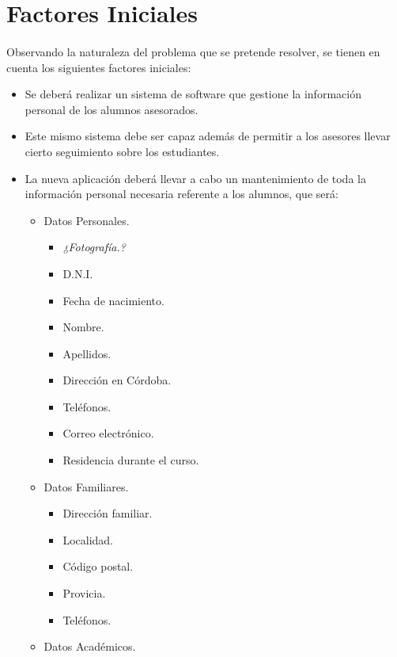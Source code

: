 \section{Factores Iniciales}

\paragraph{}Observando la naturaleza del problema que se pretende resolver, se
tienen en cuenta los siguientes factores iniciales:

\begin{itemize}
   \item Se deberá realizar un sistema de software que gestione la información
   personal de los alumnos asesorados.
   \item Este mismo sistema debe ser capaz además de permitir a los asesores
   llevar cierto seguimiento sobre los estudiantes.
   \item La nueva aplicación deberá llevar a cabo un mantenimiento de toda la
   información personal necesaria referente a los alumnos, que será:
   \begin{itemize}
      \item Datos Personales.
      \begin{itemize}
         \item \textit{¿Fotografía.?}
         \item D.N.I.
         \item Fecha de nacimiento.
         \item Nombre.
         \item Apellidos.
         \item Dirección en Córdoba.
         \item Teléfonos.
         \item Correo electrónico.
         \item Residencia durante el curso.
      \end{itemize}
      \item Datos Familiares.
      \begin{itemize}
         \item Dirección familiar.
         \item Localidad.
         \item Código postal.
         \item Provicia.
         \item Teléfonos.
      \end{itemize}
      \item Datos Académicos.

\end{itemize}
\end{itemize}

